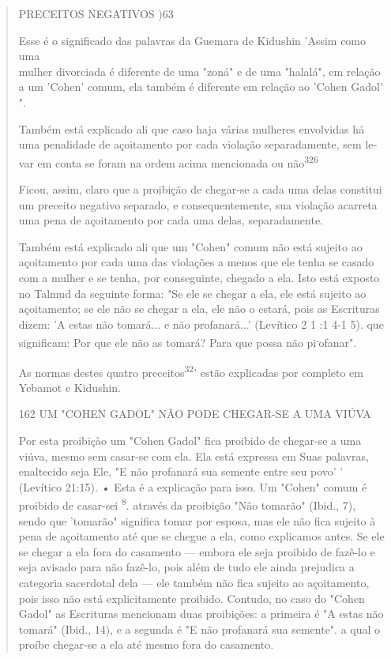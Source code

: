 \begin{quote}
PRECEITOS NEGATIVOS )63

Esse é o significado das palavras da Guemara de Kidushin 'Assim como
uma\\
mulher divorciada é diferente de uma "zoná" e de uma "halalá", em
relação\\
a um 'Cohen' comum, ela também é diferente em relação ao 'Cohen Gadol'
".

Também está explicado ali que caso haja várias mulheres envolvidas há
uma penalidade de açoitamento por cada violação separadamente, sem
le­var em conta se foram na ordem acima mencionada ou
não\textsuperscript{326}

Ficou, assim, claro que a proibição de chegar-se a cada uma delas
constitui um preceito negativo separado, e consequentemente, sua
violação acar­reta uma pena de açoitamento por cada uma delas,
separadamente.

Também está explicado ali que um "Cohen" comum não está sujei­to ao
açoitamento por cada uma das violações a menos que ele tenha se casado
com a mulher e se tenha, por conseguinte, chegado a ela. Isto está
exposto no Talmud da seguinte forma: "Se ele se chegar a ela, ele está
sujeito ao açoita­mento; se ele não se chegar a ela, ele não o estará,
pois as Escrituras dizem: 'A estas não tomará... e não profanará...'
(Levítico 2 1 :1 4-1 5). que significam: Por que ele não as tomará? Para
que possa não pi\textsuperscript{.}ofanar".

As normas destes quatro preceitos\textsuperscript{32}' estão explicadas
por comple­to em Yebamot e Kidushin.

162 UM "COHEN GADOL" NÃO PODE CHEGAR-SE A UMA VIÚVA

Por esta proibiçào um "Cohen Gadol" fica proibido de chegar-se a uma
viúva, mesmo sem casar-se com ela. Ela está expressa em Suas palavras,
enal­tecido seja Ele, "E não profanará sua semente entre seu povo' '
(Levítico 21:15). • Esta é a explicação para isso. Um "Cohen" comum é
proibido de casar-sei \textsuperscript{8}. através da proibição "Não
tomarão" (Ibid., 7), sendo que 'tomarão" sig­nifica tomar por esposa,
mas ele não fica sujeito à pena de açoitamento até que se chegue a ela,
como explicamos antes. Se ele se chegar a ela fora do casamento ---
embora ele seja proibido de fazê-lo e seja avisado para não fazê-lo,
pois além de tudo ele ainda prejudica a categoria sacerdotal dela ---
ele também não fica sujeito ao açoitamento, pois isso não está
explicitamente proibido. Contudo, no caso do "Cohen Gadol" as Escrituras
mencionam duas proibições: a primei­ra é "A estas não tomará" (Ibid.,
14), e a segunda é "E não profanará sua semen­te". a qual o proíbe
chegar-se a ela até mesmo fora do casamento.


\end{quote}
